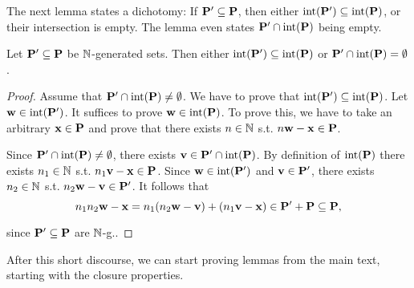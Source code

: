 The next lemma states a dichotomy: If \(\mathbf{P}' \subseteq \mathbf{P}\), then either \(\operatorname{int}(\mathbf{P}') \subseteq \operatorname{int}(\mathbf{P})\), or their intersection is empty. The lemma even states \(\mathbf{P}' \cap \operatorname{int}(\mathbf{P})\) being empty.

\begin{lemma}\label{LemmaInteriorDichotomy}
Let \(\mathbf{P}' \subseteq \mathbf{P}\) be \(\mathbb{N}\)-generated sets. Then either \(\operatorname{int}(\mathbf{P}') \subseteq \operatorname{int}(\mathbf{P})\) or \(\mathbf{P}' \cap \operatorname{int}(\mathbf{P})=\emptyset\).
\end{lemma}

\begin{proof}
Assume that \(\mathbf{P}' \cap \operatorname{int}(\mathbf{P})\neq \emptyset\). We have to prove that \(\operatorname{int}(\mathbf{P}') \subseteq \operatorname{int}(\mathbf{P})\). Let \(\mathbf{w} \in \operatorname{int}(\mathbf{P}')\). It suffices to prove \(\mathbf{w} \in \operatorname{int}(\mathbf{P})\). To prove this, we have to take an arbitrary \(\mathbf{x} \in \mathbf{P}\) and prove that there exists \(n \in \mathbb{N}\) s.t. \(n \mathbf{w}-\mathbf{x} \in \mathbf{P}\). 

Since \(\mathbf{P}' \cap \operatorname{int}(\mathbf{P}) \neq \emptyset\), there exists \(\mathbf{v} \in \mathbf{P}' \cap \operatorname{int}(\mathbf{P})\). By definition of \(\operatorname{int}(\mathbf{P})\) there exists \(n_1 \in \mathbb{N}\) s.t. \(n_1 \mathbf{v}-\mathbf{x} \in \mathbf{P}\). Since \(\mathbf{w} \in \operatorname{int}(\mathbf{P}')\) and \(\mathbf{v} \in \mathbf{P}'\), there exists \(n_2 \in \mathbb{N}\) s.t. \(n_2 \mathbf{w} - \mathbf{v} \in \mathbf{P}'\). It follows that 
\[n_1n_2 \mathbf{w} - \mathbf{x}=n_1(n_2\mathbf{w}-\mathbf{v})+(n_1 \mathbf{v} - \mathbf{x})\in \mathbf{P}' + \mathbf{P} \subseteq \mathbf{P},\]

since \(\mathbf{P}' \subseteq \mathbf{P}\) are \(\mathbb{N}\)-g..
\end{proof}

After this short discourse, we can start proving lemmas from the main text, starting with the closure properties.

\LemmaShiftGoodOverapproximation*

